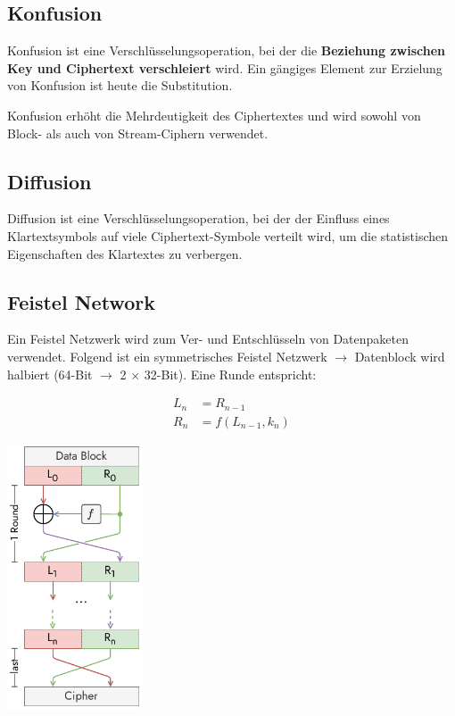 \documentclass[
  10pt,
  a4paper,
  twocolumn]{article}
\begin{document}
\subsection{Konfusion}\label{konfusion}

Konfusion ist eine Verschlüsselungsoperation, bei der die
\textbf{Beziehung zwischen Key und Ciphertext verschleiert} wird. Ein
gängiges Element zur Erzielung von Konfusion ist heute die Substitution.

Konfusion erhöht die Mehrdeutigkeit des Ciphertextes und wird sowohl von
Block- als auch von Stream-Ciphern verwendet.

\subsection{Diffusion}\label{diffusion}

Diffusion ist eine Verschlüsselungsoperation, bei der der Einfluss eines
Klartextsymbols auf viele Ciphertext-Symbole verteilt wird, um die
statistischen Eigenschaften des Klartextes zu verbergen.

\subsection{\texorpdfstring{Feistel Network
\href{https://www.youtube.com/watch?v=FGhj3CGxl8I}{\color{BrickRed}\faYoutube}}{Feistel Network }}\label{feistel-network}

Ein Feistel Netzwerk wird zum Ver- und Entschlüsseln von Datenpaketen
verwendet. Folgend ist ein symmetrisches Feistel Netzwerk
\(\rightarrow\) Datenblock wird halbiert (64-Bit \(\rightarrow\) 2
\(\times\) 32-Bit). Eine Runde entspricht:

\[
\begin{split}
  L_n &= R_{n-1}\\
  R_n &= f(L_{n-1},k_n)
\end{split}
\]

\begin{center}
\includegraphics[width=4cm,height=\textheight]{images/crypto/feistel_network.pdf}
\end{center}
\end{document}
